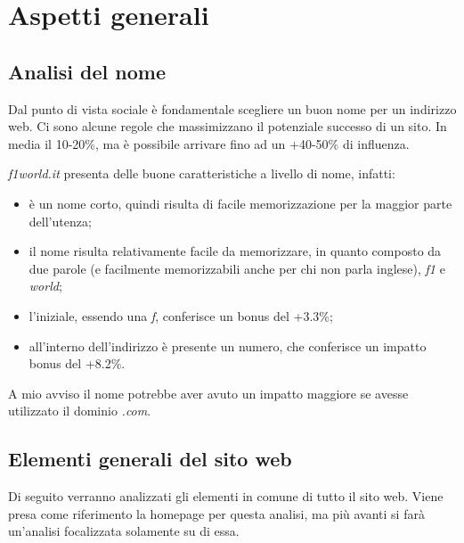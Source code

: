 \section{Aspetti generali}

\subsection{Analisi del nome}
Dal punto di vista sociale \`e fondamentale scegliere un buon nome per un
indirizzo web. Ci sono alcune regole che massimizzano il potenziale successo di
un sito. In media il 10-20\%, ma \`e possibile arrivare fino ad un +40-50\%
di influenza.

\textit{f1world.it} presenta delle buone caratteristiche a livello di nome,
infatti:
\begin{itemize}

\item \`e un nome corto, quindi risulta di facile memorizzazione per la maggior
  parte dell'utenza;
\item il nome risulta relativamente facile da memorizzare, in quanto composto
  da due parole (e facilmente memorizzabili anche per chi non parla inglese),
  \textit{f1} e \textit{world};
\item l'iniziale, essendo una \textit{f}, conferisce un bonus del +3.3\%;
\item all'interno dell'indirizzo \`e presente un numero, che conferisce un
  impatto bonus del +8.2\%.
\end{itemize}

A mio avviso il nome potrebbe aver avuto un impatto maggiore se avesse
utilizzato il dominio \textit{.com}.


\subsection{Elementi generali del sito web}

Di seguito verranno analizzati gli elementi in comune di tutto il sito web.
Viene presa come riferimento la homepage per questa analisi, ma pi\`u avanti
si far\`a un'analisi focalizzata solamente su di essa.

